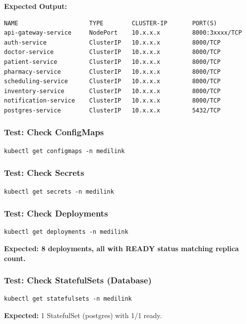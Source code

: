 \documentclass[12pt,a4paper]{article}
\begin{document}
\textbf{Expected Output:}
\begin{lstlisting}[style=bash]
NAME                    TYPE        CLUSTER-IP       PORT(S)
api-gateway-service     NodePort    10.x.x.x         8000:3xxxx/TCP
auth-service            ClusterIP   10.x.x.x         8000/TCP
doctor-service          ClusterIP   10.x.x.x         8000/TCP
patient-service         ClusterIP   10.x.x.x         8000/TCP
pharmacy-service        ClusterIP   10.x.x.x         8000/TCP
scheduling-service      ClusterIP   10.x.x.x         8000/TCP
inventory-service       ClusterIP   10.x.x.x         8000/TCP
notification-service    ClusterIP   10.x.x.x         8000/TCP
postgres-service        ClusterIP   10.x.x.x         5432/TCP
\end{lstlisting}

\subsubsection{Test: Check ConfigMaps}
\begin{lstlisting}[style=bash]
kubectl get configmaps -n medilink
\end{lstlisting}

\subsubsection{Test: Check Secrets}
\begin{lstlisting}[style=bash]
kubectl get secrets -n medilink
\end{lstlisting}

\subsubsection{Test: Check Deployments}
\begin{lstlisting}[style=bash]
kubectl get deployments -n medilink
\end{lstlisting}

\textbf{Expected: 8 deployments, all with READY status matching replica count.}

\subsubsection{Test: Check StatefulSets (Database)}
\begin{lstlisting}[style=bash]
kubectl get statefulsets -n medilink
\end{lstlisting}

\textbf{Expected:} 1 StatefulSet (postgres) with 1/1 ready.
\end{document}
